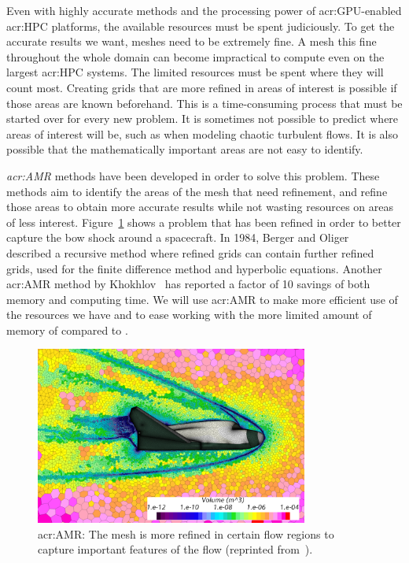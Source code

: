 Even with highly accurate methods and the processing power of \acrshort{acr:GPU}-enabled
\acrshort{acr:HPC} platforms, the available resources must be spent judiciously. To get the accurate
results we want, meshes need to be extremely fine. A mesh this fine throughout the whole domain can
become impractical to compute even on the largest \acrshort{acr:HPC} systems. The limited resources
must be spent where they will count most. Creating grids that are more refined in areas of interest
is possible if those areas are known beforehand. This is a time-consuming process that must be
started over for every new problem. It is sometimes not possible to predict where areas of interest
will be, such as when modeling chaotic turbulent flows. It is also possible that the mathematically
important areas are not easy to identify. 

\textit{\Acrfull{acr:AMR}} methods have been developed in order to solve this problem. These methods
aim to identify the areas of the mesh that need refinement, and refine those areas to obtain more
accurate results while not wasting resources on areas of less interest. Figure~\ref{fig:intro_amr}
shows a problem that has been refined in order to better capture the bow shock around a spacecraft.
In 1984, Berger and Oliger~\cite{Berger1984} described a recursive method where refined grids can
contain further refined grids, used for the finite difference method and hyperbolic equations.
Another \acrshort{acr:AMR} method by Khokhlov~\cite{Khokhlov1998} has reported a factor of 10
savings of both memory and computing time. We will use \acrlong{acr:AMR} to make more efficient use
of the resources we have and to ease working with the more limited amount of memory of
 compared to .

\begin{figure}[H]
	\centering
	\includegraphics[width=0.8\textwidth]{Chapter_introduction/media/adaptive_mesh_refinement}
	\caption{\Acrlong{acr:AMR}: The mesh is more refined in certain flow regions to capture important features of the flow (reprinted from~\cite{Siemens2020}).}\label{fig:intro_amr}
\end{figure}

